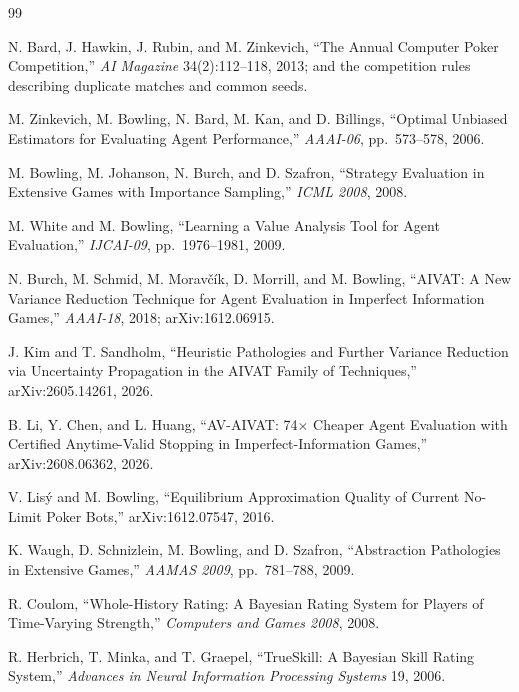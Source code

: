 \begin{thebibliography}{99}

N. Bard, J. Hawkin, J. Rubin, and M. Zinkevich, ``The Annual Computer Poker
Competition,'' \emph{AI Magazine} 34(2):112--118, 2013; and the competition
rules describing duplicate matches and common seeds.

M. Zinkevich, M. Bowling, N. Bard, M. Kan, and D. Billings, ``Optimal Unbiased
Estimators for Evaluating Agent Performance,'' \emph{AAAI-06}, pp.~573--578,
2006.

M. Bowling, M. Johanson, N. Burch, and D. Szafron, ``Strategy Evaluation in
Extensive Games with Importance Sampling,'' \emph{ICML 2008}, 2008.

M. White and M. Bowling, ``Learning a Value Analysis Tool for Agent
Evaluation,'' \emph{IJCAI-09}, pp.~1976--1981, 2009.

N. Burch, M. Schmid, M. Morav\v{c}\'ik, D. Morrill, and M. Bowling, ``AIVAT: A
New Variance Reduction Technique for Agent Evaluation in Imperfect Information
Games,'' \emph{AAAI-18}, 2018; arXiv:1612.06915.

J. Kim and T. Sandholm, ``Heuristic Pathologies and Further Variance Reduction
via Uncertainty Propagation in the AIVAT Family of Techniques,''
arXiv:2605.14261, 2026.

B. Li, Y. Chen, and L. Huang, ``AV-AIVAT: 74$\times$ Cheaper Agent Evaluation
with Certified Anytime-Valid Stopping in Imperfect-Information Games,''
arXiv:2608.06362, 2026.

V. Lis\'y and M. Bowling, ``Equilibrium Approximation Quality of Current
No-Limit Poker Bots,'' arXiv:1612.07547, 2016.

K. Waugh, D. Schnizlein, M. Bowling, and D. Szafron, ``Abstraction Pathologies
in Extensive Games,'' \emph{AAMAS 2009}, pp.~781--788, 2009.

R. Coulom, ``Whole-History Rating: A Bayesian Rating System for Players of
Time-Varying Strength,'' \emph{Computers and Games 2008}, 2008.

R. Herbrich, T. Minka, and T. Graepel, ``TrueSkill\texttrademark: A Bayesian
Skill Rating System,'' \emph{Advances in Neural Information Processing Systems}
19, 2006.


\end{thebibliography}
